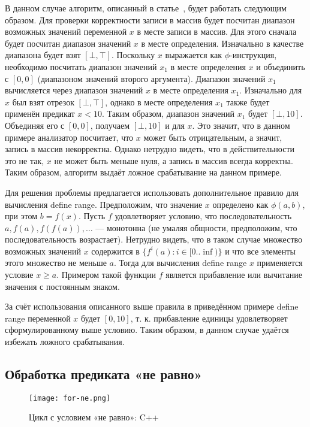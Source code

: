 В данном случае алгоритм, описанный в статье~\cite{li2010practical},
будет работать следующим образом. Для проверки корректности записи в
массив будет посчитан диапазон возможных значений переменной $x$ в
месте записи в массив. Для этого сначала будет посчитан диапазон
значений $x$ в месте определения. Изначально в качестве диапазона
будет взят $[\bot, \top]$. Поскольку $x$ выражается как
$\phi$-инструкция, необходимо посчитать диапазон значений $x_1$ в
месте определения $x$ и объединить с $[0, 0]$ (диапазоном значений
второго аргумента). Диапазон значений $x_1$ вычисляется через диапазон
значений $x$ в месте определения $x_1$. Изначально для $x$ был взят
отрезок $[\bot, \top]$, однако в месте определения $x_1$ также будет
применён предикат $x < 10$. Таким образом, диапазон значений $x_1$
будет $[\bot, 10]$. Объединяя его с $[0, 0]$, получаем $[\bot, 10]$ и
для $x$. Это значит, что в данном примере анализатор посчитает, что
$x$ может быть отрицательным, а значит, запись в массив
некорректна. Однако нетрудно видеть, что в действительности это не
так, $x$ не может быть меньше нуля, а запись в массив всегда
корректна. Таким образом, алгоритм выдаёт ложное срабатывание на
данном примере.

Для решения проблемы предлагается использовать дополнительное правило
для вычисления define range. Предположим, что значение $x$ определено
как $\phi(a, b)$, при этом $b = f(x)$. Пусть $f$ удовлетворяет
условию, что последовательность $a, f(a), f(f(a)), \dots$ ---
монотонна (не умаляя общности, предположим, что последовательность
возрастает). Нетрудно видеть, что в таком случае множество возможных
значений $x$ содержится в $\{f^i(a) : i \in [0 .. \inf)\}$ и что все
элементы этого множество не меньше $a$.  Тогда для вычисления define
range $x$ применяется условие $x \geq a$. Примером такой функции $f$
является прибавление или вычитание значения с постоянным знаком.

За счёт использования описанного выше правила в приведённом примере
define range переменной $x$ будет $[0, 10]$, т. к. прибавление единицы
удовлетворяет сформулированному выше условию. Таким образом, в данном
случае удаётся избежать ложного срабатывания.

\subsection{Обработка предиката «не равно»}

\begin{figure}
    \texttt{[image: for-ne.png]}
    \caption{Цикл с условием «не равно»: C++}
    \label{fig:for-ne-cpp}
\end{figure}

